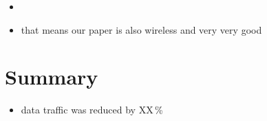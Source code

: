 \documentclass[12pt,a4paper]{scrartcl}
\begin{document}
\begin{itemize}
	\item 
	\item that means our paper is also wireless and very very good
\end{itemize}


\section*{Summary}

\begin{itemize}
	\item data traffic was reduced by XX\,\% 
\end{itemize}




\end{document}
